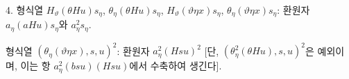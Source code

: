 
4. 형식열 $H_\vartheta(\theta Hu)s_\eta$, $\theta_\eta(\theta Hu)s_\eta$, $H_\vartheta(\vartheta\eta x)s_\eta$, $\theta_\eta(\vartheta\eta x)s_\eta$:
환원자 $a_\eta(aHu)s_\eta$와 $a_\eta^2s_\eta$.

형식열 $(\theta_\eta(\vartheta\eta x),s,u)^2$: 환원자 $a_\eta^2(Hsu)^2$ [단, $(\theta_\eta^2(\theta Hu),s,u)^2$은 예외이며, 이는 항 $a_\eta^2(bsu)(Hsu)$에서 수축하여 생긴다].

